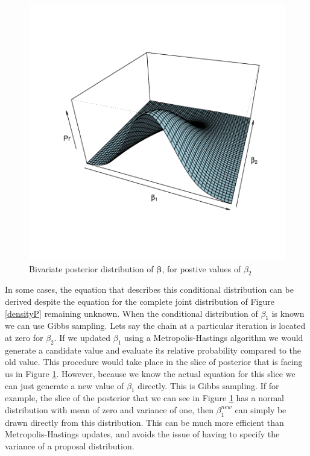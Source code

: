 \documentclass{article}
\begin{document}
\begin{figure}[!h]
\begin{center}
\includegraphics{Tutorial-007}
\end{center}
\caption{Bivariate posterior distribution of $\bm{\beta}$, for postive values of $\beta_{2}$}
\label{densityPgibbs}
\end{figure}

 In some cases, the equation that describes this conditional distribution can be derived despite the equation for the complete joint distribution of Figure \ref{densityP} remaining unknown.  When the conditional distribution of $\beta_{1}$ is known we can use Gibbs sampling. Lets say the chain at a particular iteration is located at zero for $\beta_{2}$.  If we updated $\beta_{1}$ using a Metropolis-Hastings algorithm we would generate a candidate value and evaluate its relative probability compared to the old value.  This procedure would take place in the slice of posterior that is facing us in Figure \ref{densityPgibbs}. However, because we know the actual equation for this slice we can just generate a new value of $\beta_{1}$ directly. This is Gibbs sampling.  If for example, the slice of the posterior that we can see in Figure \ref{densityPgibbs} has a normal distribution with mean of zero and variance of one, then $\beta_{1}^{new}$ can simply be drawn directly from this distribution. This can be much more efficient than Metropolis-Hastings updates, and avoids the issue of having to specify the variance of a proposal distribution.\\
\end{document}
